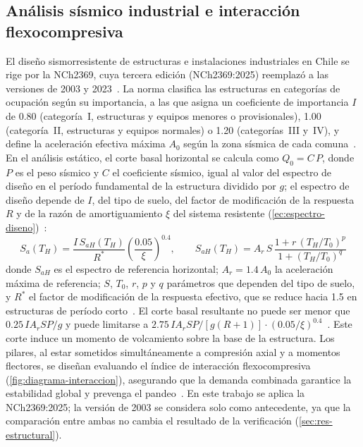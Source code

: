 \subsection{Análisis sísmico industrial e interacción flexocompresiva}

El diseño sismorresistente de estructuras e instalaciones industriales en Chile se rige por la NCh2369, cuya tercera edición (NCh2369:2025) reemplazó a las versiones de 2003 y 2023~\parencite{inn2025nch2369}.
La norma clasifica las estructuras en categorías de ocupación según su importancia, a las que asigna un coeficiente de importancia $I$ de \num{0.80} (categoría~I, estructuras y equipos menores o provisionales), \num{1.00} (categoría~II, estructuras y equipos normales) o \num{1.20} (categorías~III y~IV), y define la aceleración efectiva máxima $A_0$ según la zona sísmica de cada comuna~\parencite{inn2025nch2369}.
En el análisis estático, el corte basal horizontal se calcula como $Q_0 = C\,P$, donde $P$ es el peso sísmico y $C$ el coeficiente sísmico, igual al valor del espectro de diseño en el período fundamental de la estructura dividido por $g$; el espectro de diseño depende de $I$, del tipo de suelo, del factor de modificación de la respuesta $R$ y de la razón de amortiguamiento $\xi$ del sistema resistente (\cref{ec:espectro-diseno})~\parencite{inn2025nch2369}:
\begin{equation}
  S_a(T_H) = \frac{I\, S_{aH}(T_H)}{R^{*}} \left(\frac{\num{0.05}}{\xi}\right)^{\num{0.4}}, \qquad
  S_{aH}(T_H) = A_r\, S\, \frac{1 + r\,(T_H/T_0)^{p}}{1 + (T_H/T_0)^{q}}
  \label{ec:espectro-diseno}
\end{equation}
donde $S_{aH}$ es el espectro de referencia horizontal; $A_r = \num{1.4}\,A_0$ la aceleración máxima de referencia; $S$, $T_0$, $r$, $p$ y $q$ parámetros que dependen del tipo de suelo, y $R^{*}$ el factor de modificación de la respuesta efectivo, que se reduce hacia \num{1.5} en estructuras de período corto~\parencite{inn2025nch2369}.
El corte basal resultante no puede ser menor que $\num{0.25}\, I A_r S P/g$ y puede limitarse a $\num{2.75}\, I A_r S P / [g (R+1)] \cdot (\num{0.05}/\xi)^{\num{0.4}}$~\parencite{inn2025nch2369}.
Este corte induce un momento de volcamiento sobre la base de la estructura.
Los pilares, al estar sometidos simultáneamente a compresión axial y a momentos flectores, se diseñan evaluando el índice de interacción flexocompresiva (\cref{fig:diagrama-interaccion}), asegurando que la demanda combinada garantice la estabilidad global y prevenga el pandeo~\parencite{aisc2016specification}.
En este trabajo se aplica la NCh2369:2025; la versión de 2003 se considera solo como antecedente, ya que la comparación entre ambas no cambia el resultado de la verificación (\cref{sec:res-estructural}).


